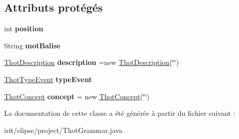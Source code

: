 \subsection*{Attributs protégés}
\begin{DoxyCompactItemize}
\item 
\mbox{\label{classfr_1_1irit_1_1elipse_1_1project_1_1_thot_grammar_a9b950fa9d354858da6548fa9c32b2376}} 
int {\bfseries position}
\item 
\mbox{\label{classfr_1_1irit_1_1elipse_1_1project_1_1_thot_grammar_a12fd3023e873d47f1ca12ed2023c36ee}} 
String {\bfseries mot\+Balise}
\item 
\mbox{\label{classfr_1_1irit_1_1elipse_1_1project_1_1_thot_grammar_ac9475449fc7ab867ba8e8444bc9f7637}} 
\mbox{\hyperlink{classfr_1_1irit_1_1elipse_1_1project_1_1_thot_description}{Thot\+Description}} {\bfseries description} =new \mbox{\hyperlink{classfr_1_1irit_1_1elipse_1_1project_1_1_thot_description}{Thot\+Description}}(\char`\"{}\char`\"{})
\item 
\mbox{\label{classfr_1_1irit_1_1elipse_1_1project_1_1_thot_grammar_a899bc9247e04b51b8b161530003d6c9d}} 
\mbox{\hyperlink{enumfr_1_1irit_1_1elipse_1_1project_1_1_thot_type_event}{Thot\+Type\+Event}} {\bfseries type\+Event}
\item 
\mbox{\label{classfr_1_1irit_1_1elipse_1_1project_1_1_thot_grammar_a420c1805f9f77a3d4b2d894f37e9b320}} 
\mbox{\hyperlink{classfr_1_1irit_1_1elipse_1_1project_1_1_thot_concept}{Thot\+Concept}} {\bfseries concept} = new \mbox{\hyperlink{classfr_1_1irit_1_1elipse_1_1project_1_1_thot_concept}{Thot\+Concept}}(\char`\"{}\char`\"{})
\end{DoxyCompactItemize}


La documentation de cette classe a été générée à partir du fichier suivant \+:\begin{DoxyCompactItemize}
\item 
irit/elipse/project/Thot\+Grammar.\+java\end{DoxyCompactItemize}
